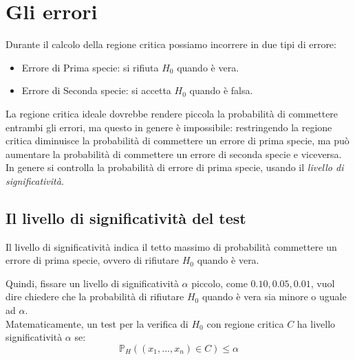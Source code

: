 \section{Gli errori}
Durante il calcolo della regione critica possiamo incorrere in due tipi di errore:
\begin{itemize}
    \item Errore di Prima specie: si rifiuta $H_0$ quando è vera.
    \item Errore di Seconda specie: si accetta $H_0$ quando è falsa.
\end{itemize}
La regione critica ideale dovrebbe rendere piccola la probabilità di commettere
entrambi gli errori, ma questo in genere è impossibile: restringendo la regione
critica diminuisce la probabilità di commettere un errore di prima specie, ma
può aumentare la probabilità di commettere un errore di seconda specie e viceversa.
\\In genere si controlla la probabilità di errore di prima specie, usando il \emph{livello di significatività}.

\subsection{Il livello di significatività del test}
Il livello di significatività indica il tetto massimo di probabilità commettere un errore di prima specie, ovvero di rifiutare $H_0$ quando è vera.

Quindi, fissare un livello di significatività $\alpha$ piccolo, come $0.10, 0.05, 0.01$, vuol dire chiedere che la probabilità di rifiutare $H_0$ quando è vera sia minore o uguale ad $\alpha$.
\\Matematicamente, un test per la verifica di $H_0$ con regione critica $C$ ha livello significatività $\alpha$ se:
\[
    \mathbb{P}_H((x_1, ..., x_n)\in C) \leq \alpha
\]
